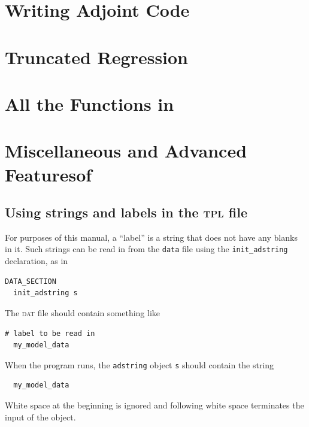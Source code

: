 \documentclass{admbmanual}
\begin{document}
\chapter{Writing Adjoint Code}
 \x


%


%  


\chapter{Truncated Regression}
 \x


\chapter{All the Functions in \ADM}


\chapter{Miscellaneous and Advanced Features\br of \ADM}


\section{Using strings and labels in the \textsc{tpl} file}

For purposes of this manual, a ``label'' is a string that does not
have any blanks in it. Such strings can be read in from the
\texttt{data} file using the \texttt{init\_adstring} declaration,
as in
\begin{lstlisting}
DATA_SECTION
  init_adstring s
\end{lstlisting}
The \textsc{dat} file should contain something like
\begin{lstlisting}
# label to be read in
  my_model_data   
\end{lstlisting}
When the program runs, the \texttt{adstring} object \texttt{s}
should contain the string
\begin{lstlisting}
  my_model_data
\end{lstlisting}
White space at
the beginning is ignored and following white space terminates
the input of the object.
\end{document}
